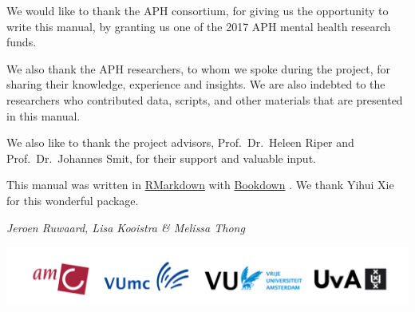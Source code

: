 \documentclass[]{book}
\begin{document}
We would like to thank the APH consortium, for giving us the opportunity
to write this manual, by granting us one of the 2017 APH mental health
research funds.

We also thank the APH researchers, to whom we spoke during the project,
for sharing their knowledge, experience and insights. We are also
indebted to the researchers who contributed data, scripts, and other
materials that are presented in this manual.

We also like to thank the project advisors, Prof.~Dr.~Heleen Riper and
Prof.~Dr.~Johannes Smit, for their support and valuable input.

This manual was written in
\href{https://rmarkdown.rstudio.com/}{RMarkdown} with
\href{http://bookdown.org}{Bookdown} \citep{R-bookdown_book}. We thank
Yihui Xie for this wonderful package.

\emph{Jeroen Ruwaard, Lisa Kooistra \& Melissa Thong}

\begin{center}\includegraphics[width=0.98\linewidth]{images/aph_consortium} \end{center}



\printindex
\end{document}
